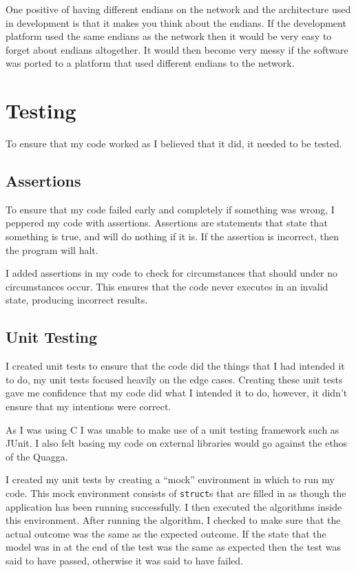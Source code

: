 \documentclass[12pt]{report}
\begin{document}
One positive of having different endians on the network and the architecture
used in development is that it makes you think about the endians. If the
development platform used the same endians as the network then it would be very
easy to forget about endians altogether. It would then become very messy if the
software was ported to a platform that used different endians to the network.
    
\chapter{Testing}
To ensure that my code worked as I believed that it did, it needed to be
tested. 

\section{Assertions}
To ensure that my code failed early and completely if something was wrong, I
peppered my code with assertions. Assertions are statements that state that
something is true, and will do nothing if it is. If the assertion is incorrect,
then the program will halt.

I added assertions in my code to check for circumstances that should under no
circumstances occur. This ensures that the code never executes in an invalid
state, producing incorrect results. 

\section{Unit Testing}
I created unit tests to ensure that the code did the things that I had intended
it to do, my unit tests focused heavily on the edge cases. Creating these unit
tests gave me confidence that my code did what I intended it to do, however, it
didn't ensure that my intentions were correct. 

As I was using C I was unable to make use of a unit testing framework such as
JUnit. I also felt basing my code on external libraries would go against
the ethos of the Quagga.

I created my unit tests by creating a ``mock'' environment in which to run my
code. This mock environment consists of \texttt{struct}s that are filled in as
though the application has been running successfully.  I then executed the
algorithms inside this environment. After running the algorithm, I checked to
make sure that the actual outcome was the same as the expected outcome. If the
state that the model was in at the end of the test was the same as expected
then the test was said to have passed, otherwise it was said to have failed. 
\end{document}
